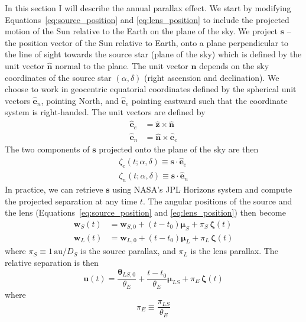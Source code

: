 \documentclass[12pt,dvipsnames]{report}
\renewcommand{\vec}[1]{\boldsymbol{\mathbf{#1}}}
\begin{document}
In this section I will describe the annual parallax effect. We start by
modifying Equations~\ref{eq:source_position} and \ref{eq:lens_position} to
include the projected motion of the Sun relative to the Earth on the plane of
the sky. We project $\mathbf s$ -- the position vector of the Sun relative to
Earth, onto a plane perpendicular to the line of sight towards the source star
(plane of the sky) which is defined by the unit vector $\boldsymbol{\hat n}$
normal to the plane. The unit vector $\boldsymbol{\hat n}$ depends on the sky
coordinates of the source star $(\alpha,\delta)$ (right ascension and
declination). We choose to work in geocentric equatorial coordinates defined by
the spherical unit vectors $\hat{\mathbf e}_n$, pointing North, and
$\hat{\mathbf e}_e$ pointing eastward such that the coordinate system is
right-handed. The unit vectors are defined by
\begin{align}
    \hat{\mathbf e}_e & = \hat{\mathbf z}\times \hat{\mathbf n}  \\
    \hat{\mathbf e}_n & = \hat{\mathbf n}\times\hat{\mathbf e}_e
\end{align}
The two components of $\mathbf s$ projected onto the plane of the sky are then
\begin{align}
    \zeta_e(t;\alpha,\delta)\equiv \mathbf s\cdot \hat{\mathbf e}_e \\
    \zeta_n(t;\alpha,\delta)\equiv \mathbf s\cdot \hat{\mathbf e}_n
\end{align}
In practice, we can retrieve $\mathbf{s}$ using NASA's JPL Horizons system and compute
the projected separation at any time $t$.
The angular positions of the source and the lens
(Equations~\ref{eq:source_position} and \ref{eq:lens_position}) then become
\begin{align}
    \vec{w}_S(t) & = \vec{w}_{S,0}+(t-t_0)\boldsymbol{\mu}_S
    +\pi_S\,\boldsymbol{\zeta}(t)                            \\
    \vec{w}_L(t) & = \vec{w}_{L,0}+(t-t_0)\boldsymbol{\mu}_L
    +\pi_L\,\boldsymbol{\zeta}(t)
\end{align}
where  $\pi_S\equiv 1\,\mathrm{au}/D_S$ is the source parallax, and $\pi_L$ is the
lens parallax.
The relative separation is then
\begin{equation}
    \boldsymbol{u}(t)= \frac{\boldsymbol\theta_{LS, 0}}{\theta_E}
    +\frac{t-t_0}{\theta_E}\boldsymbol{\mu}_{LS}+\pi_{E}\,\boldsymbol{\zeta}(t)
    \label{eq:relative_separation_parallax}
\end{equation}
where
\begin{equation}
    \pi_E\equiv \frac{\pi_{LS}}{\theta_E}
    \label{eq:pi_E}
\end{equation}
\end{document}
